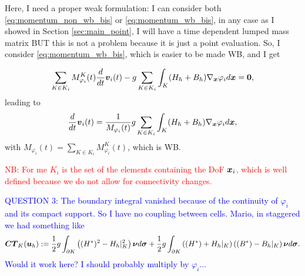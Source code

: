 \documentclass[english]{article}
\theoremstyle{thmstyleone}
\theoremstyle{thmstyletwo}
\theoremstyle{thmstylethree}
\newcommand{\uvec}[2][3]{\boldsymbol{#2\mkern-#1mu}\mkern#1mu}
\begin{document}
Here, I need a proper weak formulation: I can consider both \eqref{eq:momentum_non_wb_bis} or \eqref{eq:momentum_wb_bis}, in any case as I showed in Section \ref{sec:main_point}, I will have a time dependent lumped mass matrix BUT this is not a problem because it is just a point evaluation. So, I consider \eqref{eq:momentum_wb_bis}, which is easier to be made WB, and I get

\begin{equation}
\sum_{K \in K_i} M^K_{\varphi_i}(t)\frac{d}{dt}\uvec{v}_i(t)-g \sum_{K \in K_i} \int_K (H_h+B_h)\nabla_{\uvec{x}} \varphi_i d\uvec{x}=\uvec{0},
\end{equation}
leading to
\begin{equation}
\frac{d}{dt}\uvec{v}_i(t)=\frac{1}{M_{\varphi_i}(t)}g \sum_{K \in K_i} \int_K (H_h+B_h)\nabla_{\uvec{x}} \varphi_i d\uvec{x},
\end{equation}
with $M_{\varphi_i}(t)=\sum_{K \in K_i} M^K_{\varphi_i}(t)$, which is WB.


\textcolor{red}{
NB: For me $K_i$ is the set of the elements containing the DoF $\uvec{x}_i$, which is well defined because we do not allow for connectivity changes.
}



\textcolor{blue}{
QUESTION $3$: The boundary integral vanished because of the continuity of $\varphi_i$ and its compact support. So I have no coupling between cells. Mario, in staggered we had something like
\begin{align}
\begin{split}
\uvec{CT}_K(\uvec{u}_h):=\frac{1}{2}g\int_{\partial K}  \left( (H^*)^2-H_h\vert_K^2 \right) \uvec{\nu} d \uvec{\sigma}+\frac{1}{2}g\int_{\partial K}  \left( (H^*)+H_h\vert_K \right)\left( (B^*)-B_h\vert_K \right) \uvec{\nu} d \uvec{\sigma}.
\end{split}
\label{eq:CT}
\end{align}
Would it work here? I should probably multiply by $\varphi_i$...
}
\end{document}
